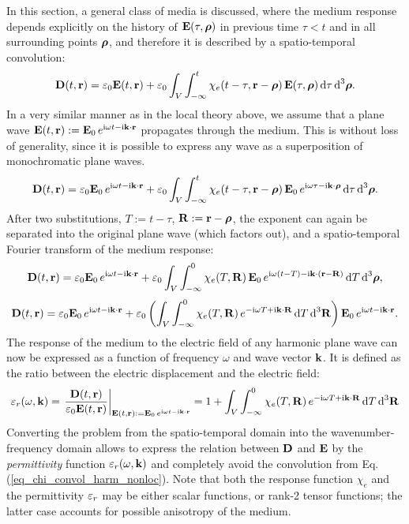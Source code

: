 In this section, a general class of media is discussed, where the medium response depends explicitly on the history of $\mathbf{E}(\tau, \boldsymbol{\rho})$ in previous time $\tau < t$ and in all surrounding points $\boldsymbol{\rho}$, and therefore it is described by a spatio-temporal convolution:
\begin{equation} \mathbf{D}(t,{\mathbf{r}}) = \varepsilon_0 \mathbf{E}(t,{\mathbf{r}}) + \varepsilon_0\int_{V} \int_{-\infty}^{t} \chi_e(t-\tau, {\mathbf{r}}-\boldsymbol{\rho}) \, \mathbf{E}(\tau,\boldsymbol{\rho}) \,\mbox{d}\tau \,\mbox{d}^3\boldsymbol{\rho}. \label{eq_chi_convol_nonloc}\end{equation}
In a very similar manner as in the local theory above, we assume that a plane wave $\mathbf{E}(t, {\mathbf{r}}) := \mathbf{E}_0 \, e^{{\mathrm i}\omega t - {\mathrm i}{\mathbf{k}}\cdot{\mathbf{r}}}$ propagates through the medium. This is without loss of generality, since it is possible to express any wave as a superposition of monochromatic plane waves.
\begin{equation} \mathbf{D}(t,{\mathbf{r}}) = \varepsilon_0 \mathbf{E}_0 \, e^{{\mathrm i}\omega t - {\mathrm i}{\mathbf{k}}\cdot{\mathbf{r}}} + \varepsilon_0\int_{V} \int_{-\infty}^{t} \chi_e(t-\tau, {\mathbf{r}}-\boldsymbol{\rho}) \, \mathbf{E}_0 \, e^{{\mathrm i}\omega \tau - {\mathrm i}{\mathbf{k}}\cdot\boldsymbol{\rho}} \,\mbox{d}\tau \,\mbox{d}^3\boldsymbol{\rho}. \label{eq_chi_convol_harm_nonloc}\end{equation}
After two  substitutions, $T:=t-\tau$, $\mathbf{R}:={\mathbf{r}}-\boldsymbol{\rho}$, the exponent can again be separated into the original plane wave (which factors out), and a spatio-temporal Fourier transform of the medium response:
$$				 \mathbf{D}(t,{\mathbf{r}}) = \varepsilon_0 \mathbf{E}_0 \, e^{{\mathrm i}\omega t - {\mathrm i}{\mathbf{k}}\cdot{\mathbf{r}}} + \varepsilon_0\int_{V} \int_{-\infty}^{0} \chi_e(T, \mathbf{R}) \, \mathbf{E}_0 \, e^{{\mathrm i}\omega (t - T) - {\mathrm i}{\mathbf{k}}\cdot({\mathbf{r}} - \mathbf{R})} \,\mbox{d}T \,\mbox{d}^3\boldsymbol{\rho},$$
$$				 \mathbf{D}(t,{\mathbf{r}}) = \varepsilon_0 \mathbf{E}_0 \, e^{{\mathrm i}\omega t - {\mathrm i}{\mathbf{k}}\cdot{\mathbf{r}}} + \varepsilon_0\left( \int_{V} \int_{-\infty}^{0} \chi_e(T, \mathbf{R})  \, e^{-{\mathrm i}\omega T + {\mathrm i}{\mathbf{k}}\cdot \mathbf{R}}\,\mbox{d}T \,\mbox{d}^3 \mathbf{R} \right) \mathbf{E}_0 \, e^{{\mathrm i}\omega t - {\mathrm i}{\mathbf{k}}\cdot{\mathbf{r}}}.$$
The response of the medium to the electric field of any harmonic plane wave can now be expressed as a function of frequency $\omega$ and wave vector ${\mathbf{k}}$. It is defined as the ratio between the electric displacement and the electric field:
\begin{equation} \varepsilon_r(\omega, {\mathbf{k}}) = \left.\frac{\mathbf{D}(t,{\mathbf{r}})}{\varepsilon_0 \mathbf{E}(t,{\mathbf{r}})} \right|_{\mathbf{E}(t, {\mathbf{r}}) := \mathbf{E}_0 \, e^{{\mathrm i}\omega t - {\mathrm i}{\mathbf{k}}\cdot{\mathbf{r}}}}  = 1 + \int_{V} \int_{-\infty}^{0} \chi_e(T, \mathbf{R}) \,e^{-{\mathrm i}\omega T + {\mathrm i}{\mathbf{k}}\cdot \mathbf{R}} \,\mbox{d}T \,\mbox{d}^3\mathbf{R} \label{eq_eps_nonloc}\end{equation}
Converting the problem from the spatio-temporal domain into the wavenumber-frequency domain allows to express the relation between $\mathbf{D}$ and $\mathbf{E}$ by the \textit{permittivity} function $\varepsilon_r(\omega, {\mathbf{k}})$ and completely avoid the convolution from Eq. (\ref{eq_chi_convol_harm_nonloc}). Note that both the response function $\chi_e$ and the permittivity $\varepsilon_r$ 
may be either scalar functions, or rank-2 tensor functions; the latter case accounts for possible anisotropy of the medium.


